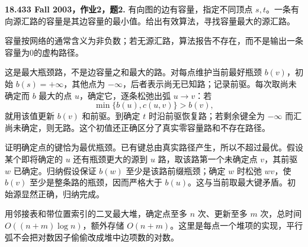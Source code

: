\begin{exercise}\label{mit:18433-a2-q2}
\textbf{18.433 Fall 2003，作业2，题2.}
有向图的边有容量，指定不同顶点 $s,t$。一条有向源汇路的容量是其边容量的最小值。给出有效算法，寻找容量最大的源汇路。

容量按网络的通常含义为非负数；若无源汇路，算法报告不存在，而不是输出一条容量为0的虚构路径。
\end{exercise}
\begin{solution}
这是最大瓶颈路，不是边容量之和最大的路。对每点维护当前最好瓶颈 $b(v)$，初始 $b(s)=+\infty$，其他点为 $-\infty$，后者表示尚无已知路；记录前驱。每次取尚未确定而 $b$ 最大的点 $u$，确定它，逐条松弛出弧 $u\to v$：若
\[
 \min\{b(u),c(u,v)\}>b(v),
\]
就用该值更新 $b(v)$ 和前驱。到确定 $t$ 时沿前驱恢复路；若剩余键全为 $-\infty$ 而汇尚未确定，则无路。这个初值还正确区分了真实零容量路和不存在路径。

证明确定点的键恰为最优瓶颈。已有键总由真实路径产生，所以不超过最优。假设某个即将确定的 $u$ 还有瓶颈更大的源到 $u$ 路，取该路第一个未确定点 $v$，其前驱 $w$ 已确定。归纳假设保证 $b(w)$ 至少是该路前缀瓶颈；确定 $w$ 时松弛 $wv$，使 $b(v)$ 至少是整条路的瓶颈，因而严格大于 $b(u)$。这与当前取最大键矛盾。初始源显然正确，归纳完成。

用邻接表和带位置索引的二叉最大堆，确定点至多 $n$ 次、更新至多 $m$ 次，总时间 $O((n+m)\log n)$，额外存储 $O(n+m)$。这里是每点一个堆项的实现，平行弧不会把对数因子偷偷改成堆中边项数的对数。
\end{solution}


